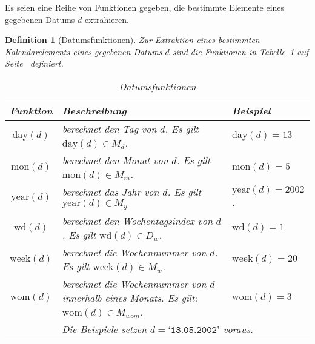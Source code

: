 \documentclass[a4paper]{article}
\newcommand*{\dayf}{\mathrm{day}}
\newcommand*{\monf}{\mathrm{mon}}
\newcommand*{\yearf}{\mathrm{year}}
\newcommand*{\wdf}{\mathrm{wd}}
\newcommand*{\weekf}{\mathrm{week}}
\newcommand*{\womf}{\mathrm{wom}}
\newcommand*{\datev}[1]{\texttt{`#1'}}
\numberwithin{equation}{section}
\newtheorem{dfn}{Definition}
\begin{document}
Es seien eine Reihe von Funktionen gegeben, die bestimmte Elemente eines
gegebenen Datums $d$ extrahieren.
\begin{dfn}[Datumsfunktionen]
  Zur Extraktion eines bestimmten Kalendarelements eines gegebenen Datums $d$
  sind die Funktionen in Tabelle~\ref{tab:dateFunctions} auf
  Seite~\pageref{tab:dateFunctions} definiert.
  \begin{table}[tp]
  \caption{Datumsfunktionen}\label{tab:dateFunctions}
  \begin{tabularx}{\textwidth}{cXl}
  \hline
  Funktion & Beschreibung & Beispiel \\
  \hline
  $\dayf(d)$ & berechnet den Tag von $d$. Es gilt $\dayf(d) \in M_d$. &
    $\dayf(d) = 13$ \\
  $\monf(d)$ & berechnet den Monat von $d$. Es gilt $\monf(d) \in M_m$. &
    $\monf(d) = 5$ \\
  $\yearf(d)$ & berechnet das Jahr von $d$. Es gilt $\yearf(d) \in M_y$ &
    $\yearf(d) = 2002$. \\
  $\wdf(d)$ & berechnet den Wochentagsindex von $d$. Es gilt $\wdf(d) \in D_w$. &
    $\wdf(d) = 1$ \\
  $\weekf(d)$ & berechnet die Wochennummer von $d$. Es gilt $\weekf(d) \in M_w$.
    & $\weekf(d) = 20$ \\
  $\womf(d)$ & berechnet die Wochennummer von $d$ innerhalb eines Monats. Es
    gilt: $\womf(d) \in M_{wom}$. & $\womf(d) = 3$ \\
  \hline
  \multicolumn{3}{c}{Die Beispiele setzen $d = \datev{13.05.2002}$ voraus.}
  \end{tabularx}\end{table}
\end{dfn}
\end{document}
